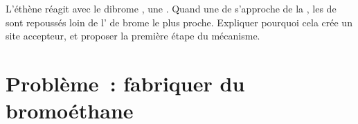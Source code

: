 \begin{exercise}[$\star\star\star$]\label{exo:g12:curly-arrows:15}
L'éthène réagit avec le dibrome , une . Quand
une  de  s'approche de la , les 
de  sont repoussés loin de l' de brome le plus proche.
Expliquer pourquoi cela crée un site accepteur, et proposer la première
étape du mécanisme.
\end{exercise}

\section{Problème~: fabriquer du bromoéthane}


